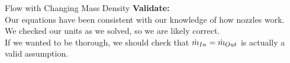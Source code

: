 \begin{example}{Flow with Changing Mass Density}
  \textbf{Validate:} \\
  Our equations have been consistent with our knowledge of how nozzles work. \\
  We checked our units as we solved, so we are likely correct. \\
  If we wanted to be thorough, we should check that $\dot{m}_{In} = \dot{m}_{Out}$ is actually a valid assumption.
\end{example}


